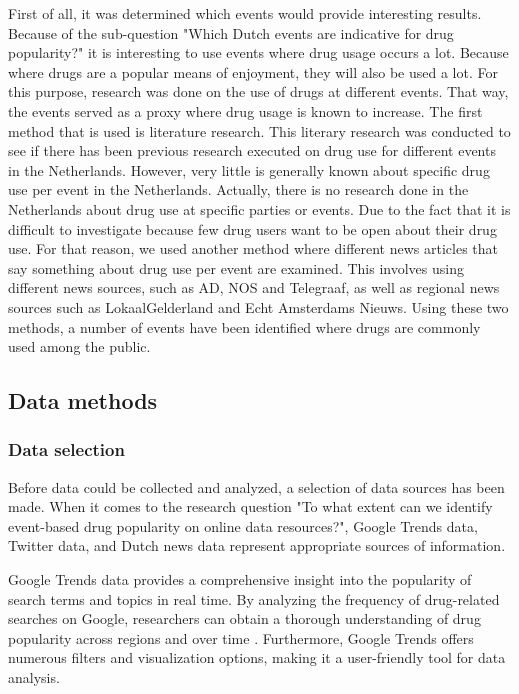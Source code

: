 First of all, it was determined which events would provide interesting results. Because of the sub-question "Which Dutch events are indicative for drug popularity?" it is interesting to use events where drug usage occurs a lot. Because where drugs are a popular means of enjoyment, they will also be used a lot.  For this purpose, research was done on the use of drugs at different events. That way, the events served as a proxy where drug usage is known to increase.
The first method that is used is literature research. This literary research was conducted to see if there has been previous research executed on drug use for different events in the Netherlands. 
However, very little is generally known about specific drug use per event in the Netherlands. Actually, there is no research done in the Netherlands about drug use at specific parties or events. Due to the fact that it is difficult to investigate because few drug users want to be open about their drug use. 
For that reason, we used another method where different news articles that say something about drug use per event are examined. This involves using different news sources, such as AD, NOS and Telegraaf, as well as regional news sources such as LokaalGelderland and Echt Amsterdams Nieuws. 
Using these two methods, a number of events have been identified where drugs are commonly used among the public. 

\subsection {Data methods}

\subsubsection{Data selection}
Before data could be collected and analyzed, a selection of data sources has been made. When it comes to the research question "To what extent can we identify event-based drug popularity on online data resources?", Google Trends data, Twitter data, and Dutch news data represent appropriate sources of information.

Google Trends data provides a comprehensive insight into the popularity of search terms and topics in real time. By analyzing the frequency of drug-related searches on Google, researchers can obtain a thorough understanding of drug popularity across regions and over time \cite{batistic}. Furthermore, Google Trends offers numerous filters and visualization options, making it a user-friendly tool for data analysis.

